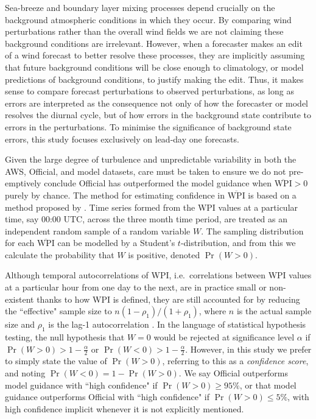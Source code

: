 \documentclass[twocol]{ametsoc}
\DeclareMathOperator{\pr}{Pr}
\begin{document}
Sea-breeze and boundary layer mixing processes depend crucially on the background atmospheric conditions in which they occur. By comparing wind perturbations rather than the overall wind fields we are not claiming these background conditions are irrelevant. However, when a forecaster makes an edit of a wind forecast to better resolve these processes, they are implicitly assuming that future background conditions will be close enough to climatology, or model predictions of background conditions, to justify making the edit. Thus, it makes sense to compare forecast perturbations to observed perturbations, as long as errors are interpreted as the consequence not only of how the forecaster or model resolves the diurnal cycle, but of how errors in the background state contribute to errors in the perturbations. To minimise the significance of background state errors, this study focuses exclusively on lead-day one forecasts.

Given the large degree of turbulence and unpredictable variability in both the AWS, Official, and model datasets, care must be taken to ensure we do not pre-emptively conclude Official has outperformed the model guidance when $\overline{\text{WPI}}>0$ purely by chance. The method for estimating confidence in $\overline{\text{WPI}}$ is based on a method proposed by \citet{griffiths17}. Time series formed from the WPI values at a particular time, say 00:00 UTC, across the three month time period, are treated as an independent random sample of a random variable $W$. The sampling distribution for each $\overline{\text{WPI}}$ can be modelled by a Student's $t$-distribution, and from this we calculate the probability that $W$ is positive, denoted $\pr\left(W > 0\right)$. 

Although temporal autocorrelations of WPI, i.e.~correlations between WPI values at a particular hour from one day to the next, are in practice small or non-existent thanks to how WPI is defined, they are still accounted for by reducing the ``effective" sample size to $ n \left(1-\rho_1\right)/\left(1+\rho_1\right)$, where $n$ is the actual sample size and $\rho_1$ is the lag-1 autocorrelation \citep{zwiers95,wilks11}. In the language of statistical hypothesis testing, the null hypothesis that $W=0$ would be rejected at significance level $\alpha$ if $\pr(W>0) > 1-\frac{\alpha}{2}$ or $\pr(W<0) > 1-\frac{\alpha}{2}$. However, in this study we prefer to simply state the value of $\pr(W>0)$, referring to this as a \textit{confidence score}, and noting $\pr(W<0) = 1- \pr(W>0)$. We say Official outperforms model guidance with ``high confidence" if $\pr(W>0) \geq 95\%$, or that model guidance outperforms Official with ``high confidence" if $\pr(W>0) \leq 5\%$, with high confidence implicit whenever it is not explicitly mentioned.
\end{document}
